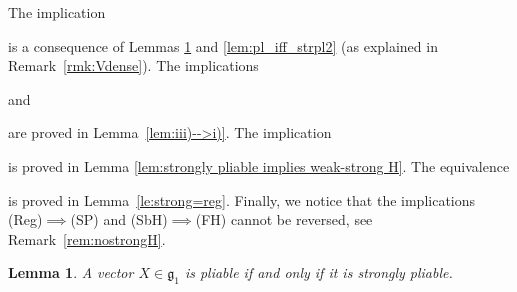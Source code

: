 \documentclass[10pt,a4paper]{amsart}
\numberwithin{equation}{section}
\newtheorem{Lemma}[Theorem]{Lemma}
\theoremstyle{definition}
\begin{document}
The implication
 is a consequence of Lemmas \ref{lem:pl_iff_strpl} and \ref{lem:pl_iff_strpl2} (as explained in Remark~\ref{rmk:Vdense}). The implications 
 and
 are proved in Lemma~\ref{lem:iii)-->i)}. The implication  is proved in Lemma \ref{lem:strongly pliable implies weak-strong H}. The equivalence  is proved in Lemma~\ref{le:strong=reg}. Finally, we notice that the implications (Reg)$\implies$(SP) and (SbH)$\implies$(FH) cannot be reversed, see Remark~\ref{rem:nostrongH}.

\begin{Lemma}\label{lem:pl_iff_strpl}
 A vector $X\in{\mathfrak g}_1$ is pliable if and only if it is strongly pliable.
\end{Lemma}
\end{document}
